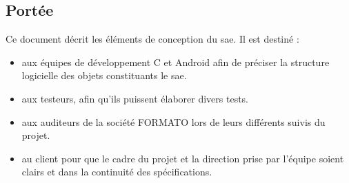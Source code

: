 \subsection{Portée} %

Ce document décrit les éléments de conception du \gls{sae}. Il est destiné :
\begin{itemize}
    \item aux équipes de développement C et Android afin de préciser la structure logicielle des objets constituants le \gls{sae}.
    \item aux testeurs, afin qu’ils puissent élaborer divers tests.
    \item aux auditeurs de la société FORMATO lors de leurs différents suivis du projet.
    \item au client pour que le cadre du projet et la direction prise par l’équipe soient clairs et dans la continuité des spécifications.
\end{itemize}